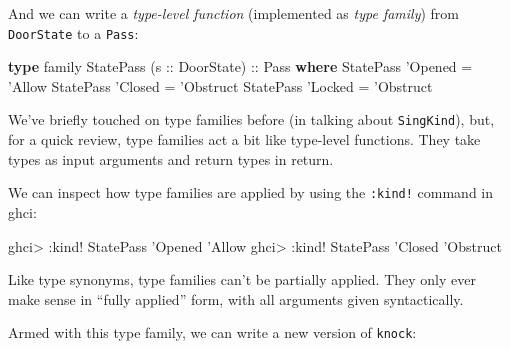 \documentclass[]{article}
\newenvironment{Shaded}{}{}
\newcommand{\CommentTok}[1]{\textcolor[rgb]{0.38,0.63,0.69}{\textit{#1}}}
\newcommand{\DataTypeTok}[1]{\textcolor[rgb]{0.56,0.13,0.00}{#1}}
\newcommand{\FunctionTok}[1]{\textcolor[rgb]{0.02,0.16,0.49}{#1}}
\newcommand{\KeywordTok}[1]{\textcolor[rgb]{0.00,0.44,0.13}{\textbf{#1}}}
\newcommand{\NormalTok}[1]{#1}
\newcommand{\OtherTok}[1]{\textcolor[rgb]{0.00,0.44,0.13}{#1}}
\newcommand{\StringTok}[1]{\textcolor[rgb]{0.25,0.44,0.63}{#1}}
\begin{document}
And we can write a \emph{type-level function} (implemented as \emph{type
family}) from \texttt{DoorState} to a \texttt{Pass}:

\begin{Shaded}
\begin{Highlighting}[]
\KeywordTok{type}\NormalTok{ family }\DataTypeTok{StatePass}\NormalTok{ (}\OtherTok{s ::} \DataTypeTok{DoorState}\NormalTok{)}\OtherTok{ ::} \DataTypeTok{Pass} \KeywordTok{where}
    \DataTypeTok{StatePass}\NormalTok{ '}\DataTypeTok{Opened} \FunctionTok{=}\NormalTok{ '}\DataTypeTok{Allow}
    \DataTypeTok{StatePass}\NormalTok{ '}\DataTypeTok{Closed} \FunctionTok{=}\NormalTok{ '}\DataTypeTok{Obstruct}
    \DataTypeTok{StatePass}\NormalTok{ '}\DataTypeTok{Locked} \FunctionTok{=}\NormalTok{ '}\DataTypeTok{Obstruct}
\end{Highlighting}
\end{Shaded}

We've briefly touched on type families before (in talking about
\texttt{SingKind}), but, for a quick review, type families act a bit like
type-level functions. They take types as input arguments and return types in
return.

We can inspect how type families are applied by using the \texttt{:kind!}
command in ghci:

\begin{Shaded}
\begin{Highlighting}[]
\NormalTok{ghci}\FunctionTok{>} \FunctionTok{:}\NormalTok{kind}\FunctionTok{!} \DataTypeTok{StatePass}\NormalTok{ '}\DataTypeTok{Opened}
\NormalTok{'}\DataTypeTok{Allow}
\NormalTok{ghci}\FunctionTok{>} \FunctionTok{:}\NormalTok{kind}\FunctionTok{!} \DataTypeTok{StatePass}\NormalTok{ '}\DataTypeTok{Closed}
\NormalTok{'}\DataTypeTok{Obstruct}
\end{Highlighting}
\end{Shaded}

Like type synonyms, type families can't be partially applied. They only ever
make sense in ``fully applied'' form, with all arguments given syntactically.

Armed with this type family, we can write a new version of \texttt{knock}:

\begin{Shaded}
\end{Shaded}
\end{document}
